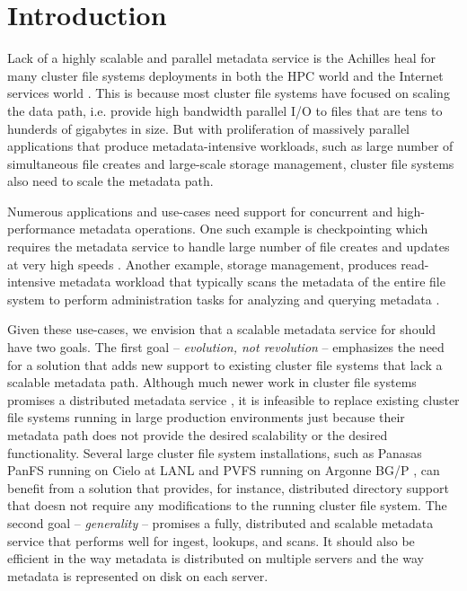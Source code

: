 \section{Introduction}

Lack of a highly scalable and parallel metadata service is the 
Achilles heal for many cluster file systems deployments in both the HPC world 
and the Internet services world \citep{hecfsio:tr06, hpcs-io:2008}.
This is because most cluster file systems have focused on scaling the
data path, i.e. provide high bandwidth parallel I/O to files that are tens to
hunderds of gigabytes in size.
But with proliferation of massively parallel applications that produce 
metadata-intensive workloads, such as large number of simultaneous file creates
and large-scale storage management, cluster file systems also need to scale the
metadata path.

Numerous applications and use-cases need support for concurrent and 
high-performance metadata operations.
One such example is checkpointing which requires the metadata service to
handle large number of file creates and updates at very high speeds 
\cite{PLFS}.
Another example, storage management, produces read-intensive metadata workload
that typically scans the metadata of the entire file system to perform
administration tasks for analyzing and querying metadata \cite{issdm}.

Given these use-cases, we envision that a scalable metadata service for 
should have two goals. 
The first goal -- \textit{evolution, not revolution} -- emphasizes the need for
a solution that adds new support to existing cluster file systems that lack a 
scalable metadata path.
Although much newer work in cluster file systems promises a distributed
metadata service \cite{ceph:weil06, 50mfiles-in-googlefs:fikes10}, it is
infeasible to replace existing cluster file systems running in large production
environments just because their metadata path does not provide the desired
scalability or the desired functionality.
Several large cluster file system installations, such as Panasas PanFS running
on Cielo at LANL \cite{panfs:welch08,cielo} and PVFS running on Argonne BG/P 
\cite{pvfs:www,bgp}, can 
benefit from a solution that provides, for instance, distributed directory support 
that doesn not require any modifications to the running cluster file system.
The second goal -- \textit{generality} -- promises a fully, distributed and
scalable metadata service that performs well for ingest, lookups, and scans. It
should also be efficient in the way metadata is distributed on multiple servers
and the way metadata is represented on disk on each server.

